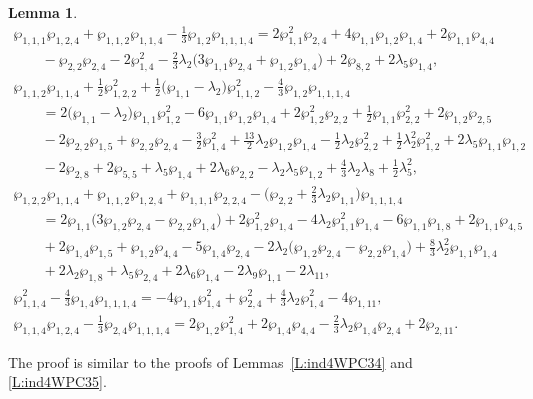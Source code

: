 \documentclass[pdftex]{sigma}
\numberwithin{equation}{section}
\newtheorem{Lemma}[Theorem]{Lemma}
\begin{document}
\begin{Lemma}
\begin{gather*}
 \wp_{1,1,1}\wp_{1,2,4} + \wp_{1,1,2}\wp_{1,1,4} - \tfrac{1}{3} \wp_{1,2} \wp_{1,1,1,4}
 = 2\wp_{1,1}^2 \wp_{2,4} + 4 \wp_{1,1} \wp_{1,2} \wp_{1,4} + 2\wp_{1,1} \wp_{4,4} \\
 \qquad {} - \wp_{2,2} \wp_{2,4} - 2 \wp_{1,4}^2 - \tfrac{2}{3} \lambda_2 \big(3\wp_{1,1} \wp_{2,4} + \wp_{1,2} \wp_{1,4}\big) + 2\wp_{8,2} + 2\lambda_5 \wp_{1,4},\\
 \wp_{1,1,2}\wp_{1,1,4} + \tfrac{1}{2} \wp_{1,2,2}^2 + \tfrac{1}{2} \big(\wp_{1,1}-\lambda_2\big) \wp_{1,1,2}^2 - \tfrac{4}{3} \wp_{1,2} \wp_{1,1,1,4}\\
 \qquad{} = 2\big(\wp_{1,1}-\lambda_2\big) \wp_{1,1} \wp_{1,2}^2 - 6 \wp_{1,1} \wp_{1,2} \wp_{1,4} + 2 \wp_{1,2}^2 \wp_{2,2} +\tfrac{1}{2} \wp_{1,1} \wp_{2,2}^2 + 2 \wp_{1,2} \wp_{2,5} \\
 \qquad {} - 2 \wp_{2,2} \wp_{1,5} + \wp_{2,2} \wp_{2,4} - \tfrac{3}{2} \wp_{1,4}^2 + \tfrac{13}{2} \lambda_2 \wp_{1,2} \wp_{1,4} - \tfrac{1}{2}\lambda_2 \wp_{2,2}^2
 + \tfrac{1}{2} \lambda_2^2 \wp_{1,2}^2 + 2\lambda_5 \wp_{1,1} \wp_{1,2}\\
 \qquad {} - 2 \wp_{2,8} + 2 \wp_{5,5} + \lambda_5 \wp_{1,4} + 2 \lambda_6 \wp_{2,2} - \lambda_2 \lambda_5 \wp_{1,2} + \tfrac{4}{3} \lambda_2 \lambda_8 + \tfrac{1}{2} \lambda_5^2, \\
 \wp_{1,2,2} \wp_{1,1,4} + \wp_{1,1,2}\wp_{1,2,4} + \wp_{1,1,1}\wp_{2,2,4} - \big(\wp_{2,2} + \tfrac{2}{3} \lambda_2 \wp_{1,1}\big) \wp_{1,1,1,4}\\
 \qquad{} = 2 \wp_{1,1} \big(3\wp_{1,2} \wp_{2,4} - \wp_{2,2} \wp_{1,4} \big) + 2\wp_{1,2}^2 \wp_{1,4} - 4 \lambda_2 \wp_{1,1}^2 \wp_{1,4} - 6 \wp_{1,1} \wp_{1,8} + 2 \wp_{1,1} \wp_{4,5}\\
 \qquad {} + 2\wp_{1,4} \wp_{1,5} + \wp_{1,2} \wp_{4,4} - 5 \wp_{1,4} \wp_{2,4} - 2\lambda_2 \big(\wp_{1,2} \wp_{2,4} - \wp_{2,2} \wp_{1,4} \big)
 +\tfrac{8}{3} \lambda_2^2 \wp_{1,1} \wp_{1,4}\\
 \qquad {} + 2\lambda_2 \wp_{1,8} + \lambda_5 \wp_{2,4} + 2\lambda_6 \wp_{1,4} - 2\lambda_9 \wp_{1,1}- 2 \lambda_{11}, \\
 \wp_{1,1,4}^2 - \tfrac{4}{3} \wp _{1,4} \wp _{1,1,1,4} =
 - 4 \wp _{1,1} \wp_{1,4}^2 + \wp_{2,4}^2 + \tfrac{4}{3}\lambda_2 \wp _{1,4}^2 - 4 \wp_{1,11}, \\
 \wp_{1,1,4}\wp_{1,2,4} - \tfrac{1}{3} \wp_{2,4} \wp _{1,1,1,4} = 2\wp_{1,2} \wp_{1,4}^2 +
 2\wp_{1,4} \wp_{4,4} - \tfrac{2}{3}\lambda_2 \wp_{1,4}\wp_{2,4} + 2\wp_{2,11}.
\end{gather*}
\end{Lemma}
The proof is similar to the proofs of Lemmas~\ref{L:ind4WPC34} and \ref{L:ind4WPC35}.
\end{document}
